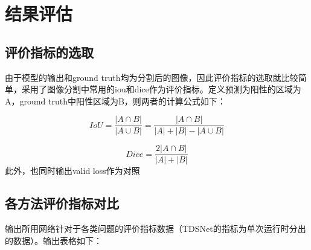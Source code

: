 \documentclass[UTF8]{ctexart}
\begin{document}
\section{结果评估}
\subsection{评价指标的选取}
由于模型的输出和ground truth均为分割后的图像，因此评价指标的选取就比较简单，采用了图像分割中常用的iou和dice作为评价指标。定义预测为阳性的区域为A，ground truth中阳性区域为B，则两者的计算公式如下：

\begin{equation}
    IoU=\frac{|A\cap B|}{|A\cup B|}=\frac{|A\cap B|}{|A|+|B|-|A\cup B|}
\end{equation}

\begin{equation}
    Dice=\frac{2|A\cap B|}{|A|+|B|}
\end{equation}
此外，也同时输出valid loss作为对照

\subsection{各方法评价指标对比}
输出所用网络针对于各类问题的评价指标数据（TDSNet的指标为单次运行时分出的数据）。输出表格如下：
\end{document}
